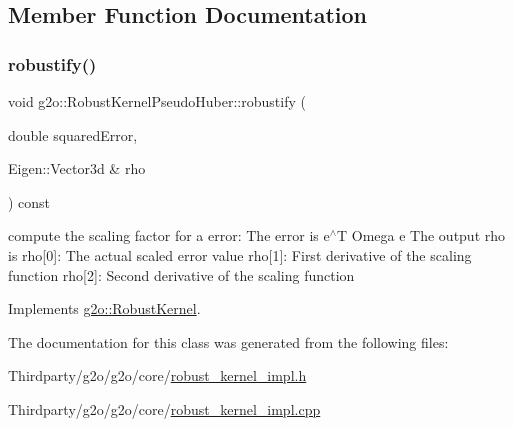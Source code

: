 \subsection{Member Function Documentation}
\mbox{\label{classg2o_1_1_robust_kernel_pseudo_huber_a7dab9bbb0e6f204a5f863220d606b0da}} 
\subsubsection{\texorpdfstring{robustify()}{robustify()}}
{\footnotesize\ttfamily void g2o\+::\+Robust\+Kernel\+Pseudo\+Huber\+::robustify (\begin{DoxyParamCaption}\item[{double}]{squared\+Error,  }\item[{Eigen\+::\+Vector3d \&}]{rho }\end{DoxyParamCaption}) const\hspace{0.3cm}{\ttfamily [virtual]}}

compute the scaling factor for a error\+: The error is e$^\wedge$T Omega e The output rho is rho\mbox{[}0\mbox{]}\+: The actual scaled error value rho\mbox{[}1\mbox{]}\+: First derivative of the scaling function rho\mbox{[}2\mbox{]}\+: Second derivative of the scaling function 

Implements \mbox{\hyperlink{classg2o_1_1_robust_kernel_ab47b071a0cfe466be063f0104bc41d0f}{g2o\+::\+Robust\+Kernel}}.



The documentation for this class was generated from the following files\+:\begin{DoxyCompactItemize}
\item 
Thirdparty/g2o/g2o/core/\mbox{\hyperlink{robust__kernel__impl_8h}{robust\+\_\+kernel\+\_\+impl.\+h}}\item 
Thirdparty/g2o/g2o/core/\mbox{\hyperlink{robust__kernel__impl_8cpp}{robust\+\_\+kernel\+\_\+impl.\+cpp}}\end{DoxyCompactItemize}
